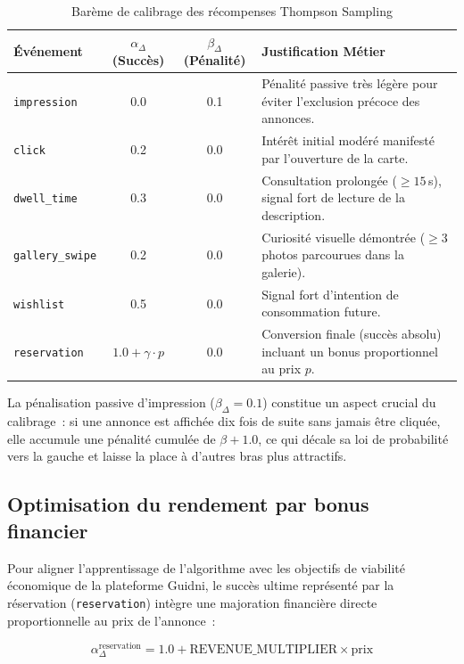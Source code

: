 \begin{table}[H]
    \centering
    \caption{Barème de calibrage des récompenses Thompson Sampling}
    \label{tab:ts_rewards}
    \small
    \begin{tabular}{p{3.5cm} c c p{6.5cm}}
        \toprule
        \textbf{Événement} & $\alpha_{\Delta}$ (Succès) & $\beta_{\Delta}$ (Pénalité) & \textbf{Justification Métier} \\
        \midrule
        \texttt{impression} & 0.0 & 0.1 & Pénalité passive très légère pour éviter l'exclusion précoce des annonces. \\
        \texttt{click} & 0.2 & 0.0 & Intérêt initial modéré manifesté par l'ouverture de la carte. \\
        \texttt{dwell\_time} & 0.3 & 0.0 & Consultation prolongée ($\ge 15$\,s), signal fort de lecture de la description. \\
        \texttt{gallery\_swipe} & 0.2 & 0.0 & Curiosité visuelle démontrée ($\ge 3$ photos parcourues dans la galerie). \\
        \texttt{wishlist} & 0.5 & 0.0 & Signal fort d'intention de consommation future. \\
        \texttt{reservation} & $1.0 + \gamma \cdot p$ & 0.0 & Conversion finale (succès absolu) incluant un bonus proportionnel au prix $p$. \\
        \bottomrule
    \end{tabular}
\end{table}

La pénalisation passive d'impression ($\beta_{\Delta} = 0.1$) constitue un aspect crucial du calibrage~: si une annonce est affichée dix fois de suite sans jamais être cliquée, elle accumule une pénalité cumulée de $\beta + 1.0$, ce qui décale sa loi de probabilité vers la gauche et laisse la place à d'autres bras plus attractifs.

\subsection{Optimisation du rendement par bonus financier}

Pour aligner l'apprentissage de l'algorithme avec les objectifs de viabilité économique de la plateforme Guidni, le succès ultime représenté par la réservation (\texttt{reservation}) intègre une majoration financière directe proportionnelle au prix de l'annonce~:

\begin{equation}
    \alpha_{\Delta}^{\text{reservation}} = 1.0 + \text{REVENUE\_MULTIPLIER} \times \text{prix}
    \label{eq:revenue_bonus}
\end{equation}

